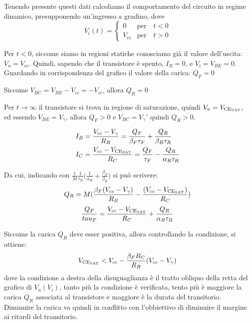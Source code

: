 \documentclass[../template]{subfiles}
\begin{document}
Tenendo presente questi dati calcoliamo il comportamento del circuito in regime dinamico, presupponendo un'ingresso a gradino, dove
\[
    V_i(t) =
    \begin{cases}
        0 & \text{per} \quad t < 0 \\
        V_{cc} & \text{per} \quad t > 0
    \end{cases}
\]
\begin{tcolorbox}
    Per $t < 0$, siccome siamo in regioni statiche conosciamo già il valore dell'uscita: $V_u = V_{cc}$.
    Quindi, sapendo che il transistore è spento, $I_B = 0$, e $V_i = V_{BE} = 0$.
    Guardando in corrispondenza del grafico il valore della carica: $Q_F = 0$

    Siccome $V_{BC} = V_{BE} - V_{cc} = -V_{cc}$, allora $Q_R = 0$
\end{tcolorbox}
\begin{tcolorbox}
    Per $t \to \infty$ il transistore si trova in regione di saturazione, quindi $V_u = V_{\text{CE}_{\text{SAT}}}$, ed essendo $V_{BE} = V_\gamma$, allora $Q_F > 0$ e $V_{BC} = V_\gamma'$ quindi $Q_R > 0$.

    \begin{align*}
        &I_B = \frac{V_{cc} - V_\gamma}{R_B} = \frac{Q_F}{\beta_F \tau_F} + \frac{Q_R}{\beta_B \tau_R}
        \\
        &I_C = \frac{V_{cc} - V_{\text{CE}_{\text{SAT}}}}{R_C} = \frac{Q_F}{\tau_F} - \frac{Q_R}{\alpha_R \tau_R}
    \end{align*}

    Da cui, indicando con $\frac{1}{M} \frac{1}{\tau_R} \big( \frac{1}{\alpha_R} + \frac{\beta_F}{\beta_R}\big)$ si può scrivere:
    \[
        Q_R = M (\frac{\beta_F(V_{cc} - V_\gamma)}{R_B} - \frac{(V_{cc} - V_{\text{CE}_{\text{SAT}}})}{R_C})
    \]
    \[
        \frac{Q_F}{tau_F} = \frac{V_{cc} - V_{\text{CE}_{\text{SAT}}}}{R_C} + \frac{Q_R}{\alpha_R \tau_R}
    \]

    Siccome la carica $Q_R$ deve esser positiva, allora controllando la condizione, si ottiene:
    \[
        V_{\text{CE}_{\text{SAT}}} < V_{cc} - \frac{\beta_F R_C}{R_B} (V_{cc} - V_\gamma)
    \]
    dove la condizione a destra della disuguaglianza è il tratto obliquo della retta del grafico di $V_u(V_i)$, tanto più la condizione è verificata, tento più è maggiore la carica $Q_R$ associata al transistore e maggiore è la durata del transitorio.
    Diminuire la carica va quindi in conflitto con l'obbiettivo di diminuire il margine ai ritardi del transitorio.
\end{tcolorbox}
\end{document}
